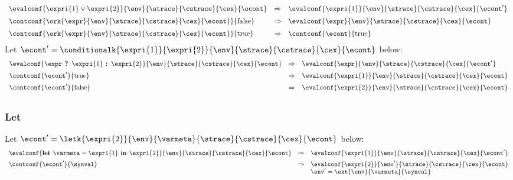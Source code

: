 \documentclass{article}
\begin{document}
\[
  \begin{array}{lcl}
	\evalconf{\expri{1} \lor \expri{2}}{\env}{\strace}{\cstrace}{\cex}{\econt}
	& \Rightarrow &
	\evalconf{\expri{1}}{\env}{\strace}{\cstrace}{\cex}{\econt'}\\[2mm]

	\contconf{\ork{\expr}{\env}{\strace}{\cstrace}{\cex}{\econt}}{\false}
	& \Rightarrow &
	\evalconf{\expr}{\env}{\strace}{\cstrace}{\cex}{\econt}\\[2mm]

	\contconf{\ork{\expr}{\env}{\strace}{\cstrace}{\cex}{\econt}}{\true}
	& \Rightarrow &
	\contconf{\econt}{\true}\\
  \end{array}
\]
\noindent
Let $\econt' = \conditionalk{\expri{1}}{\expri{2}}{\env}{\strace}{\cstrace}{\cex}{\econt}$ below:
\[
  \begin{array}{lcl}
	\evalconf{\expr \textbf{ ? } \expri{1} \textbf{ : } \expri{2}}{\env}{\strace}{\cstrace}{\cex}{\econt}
	& \Rightarrow &
	\evalconf{\expr}{\env}{\strace}{\cstrace}{\cex}{\econt'}\\[2mm]

	\contconf{\econt'}{\true}
	& \Rightarrow &
	\evalconf{\expri{1}}{\env}{\strace}{\cstrace}{\cex}{\econt}\\[2mm]

	\contconf{\econt'}{\false}
	& \Rightarrow &
	\evalconf{\expri{2}}{\env}{\strace}{\cstrace}{\cex}{\econt}\\[2mm]
  \end{array}
\]

\subsubsection{Let}
Let $\econt' = \letk{\expri{2}}{\env}{\varmeta}{\strace}{\cstrace}{\cex}{\econt}$ below:
\[
  \begin{array}{lcl}
	\evalconf{\textbf{let } \varmeta = \expri{1} \textbf{ in } \expri{2}}{\env}{\strace}{\cstrace}{\cex}{\econt}
	& \Rightarrow &
	\evalconf{\expri{1}}{\env}{\strace}{\cstrace}{\cex}{\econt'}\\[2mm]

	\contconf{\econt'}{\synval}
	& \Rightarrow &
	\evalconf{\expri{2}}{\env'}{\strace}{\cstrace}{\cex}{\econt}\\
	&&\env'=\ext{\env}{\varmeta}{\synval}\\[2mm]

  \end{array}
\]
\end{document}
